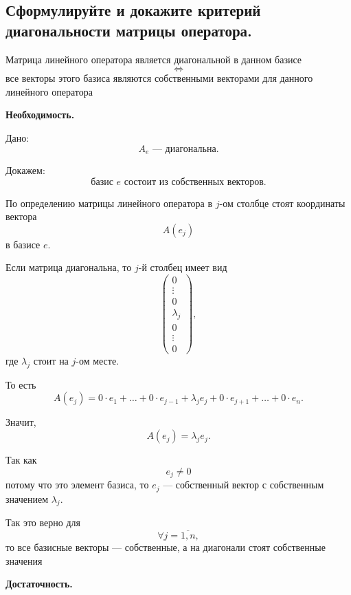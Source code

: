 \subsection{Сформулируйте и докажите критерий диагональности матрицы оператора.}

\begin{theorem}
    Матрица линейного оператора является диагональной в данном базисе
    \[
        \Longleftrightarrow
    \]
    все векторы этого базиса являются собственными векторами для данного линейного оператора
\end{theorem}

\begin{Proof}
    {\bf Необходимость.}

    Дано:
    \[
        A_e \text{ --- диагональна.}
    \]

    Докажем:
    \[
        \text{базис } e \text{ состоит из собственных векторов.}
    \]

    По определению матрицы линейного оператора в $j$-ом столбце стоят координаты вектора
    \[
        A(e_j)
    \]
    в базисе $e$.

    Если матрица диагональна, то $j$-й столбец имеет вид
    \[
        \begin{pmatrix}
            0 \\
            \vdots \\
            0 \\
            \lambda_j \\
            0 \\
            \vdots \\
            0
        \end{pmatrix},
    \]
    где $\lambda_j$ стоит на $j$-ом месте.

    То есть
    \[
        A(e_j)
        =
        0\cdot e_1+\ldots+0\cdot e_{j-1}
        +\lambda_j e_j
        +0\cdot e_{j+1}+\ldots+0\cdot e_n.
    \]

    Значит,
    \[
        A(e_j)=\lambda_j e_j.
    \]

    Так как
    \[
        e_j \neq 0
    \]
    потому что это элемент базиса, то $e_j$ --- собственный вектор с собственным значением $\lambda_j$.

    Так это верно для
    \[
        \forall j=\overline{1,n},
    \]
    то все базисные векторы --- собственные, а на диагонали стоят собственные значения

    \bigskip

    {\bf Достаточность.}


\end{Proof}
